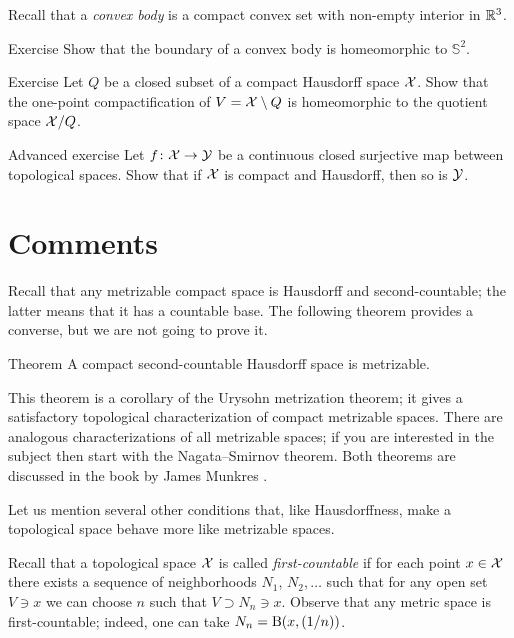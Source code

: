 Recall that a \emph{convex body} is a compact convex set with non-empty interior in $\mathbb{R}^3$.

\begin{thm}{Exercise}\label{ex:convex-body}
Show that the boundary of a convex body is homeomorphic to $\mathbb{S}^2$.
\end{thm}

\begin{thm}{Exercise}\label{ex:1-point-comp-quotinet}
Let $Q$ be a closed subset of a compact Hausdorff space $\mathcal{X}$.
Show that the one-point compactification of $V=\mathcal{X}\setminus Q$ is homeomorphic to the quotient space $\mathcal{X}/Q$.
\end{thm}


\begin{thm}{Advanced exercise}\label{ex:compact-Hausdorff-closed}
Let $f\colon\mathcal{X}\to\mathcal{Y}$ be a continuous closed surjective map between topological spaces.
Show that if $\mathcal{X}$ is compact and Hausdorff, then so is $\mathcal{Y}$.
\end{thm}



\section{Comments}\label{sec:haudorff-comments}

Recall that any metrizable compact space is Hausdorff and second-countable; the latter means that it has a countable base.
The following theorem provides a converse, but we are not going to prove it.

\begin{thm}{Theorem}
A compact second-countable Hausdorff space is metrizable.
\end{thm}

This theorem is a corollary of the Urysohn metrization theorem; it gives a satisfactory topological characterization of compact metrizable spaces.
There are analogous characterizations of all metrizable spaces;
if you are interested in the subject then start with the Nagata--Smirnov theorem.
Both theorems are discussed in the book by James Munkres \cite{munkres}.

Let us mention several other conditions that, like Hausdorffness, make a topological space behave more like metrizable spaces.

Recall that a topological space $\mathcal{X}$ is called \emph{first-countable} if for each point $x\in\mathcal{X}$ there exists a sequence of neighborhoods $N_1$, $N_2,\ldots$ such that for any open set $V\ni x$ we can choose $n$ such that $V\supset N_n\ni x$.
Observe that any metric space is first-countable; indeed, one can take $N_n=\mathrm{B}(x,(1/n))$.

